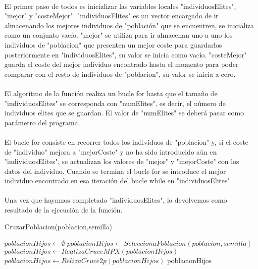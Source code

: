 	\paragraph{}El primer paso de todos es inicializar las variables locales "individuosElites", "mejor" y "costeMejor". "individuosElites" es un vector encargado de ir almacenando los mejores individuos de "población" que se encuentren, se inicializa como un conjunto vacío. "mejor" se utiliza para ir almacenan uno a uno los individuos de "poblacion" que presenten un mejor coste para guardarlos posteriormente en "individuosElites", su valor se inicia como vacío. "costeMejor" guarda el coste del mejor individuo encontrado hasta el momento para poder comparar con el resto de individuos de "poblacion", su valor se inicia a cero.
	
	\paragraph{}El algoritmo de la función realiza un bucle for hasta que el tamaño de "individuosElites" se corresponda con "numElites", es decir, el número de individuos elites que se guardan. El valor de "numElites" se deberá pasar como parámetro del programa.
	
	\paragraph{}El bucle for consiste en recorrer todos los individuos de "poblacion" y, si el coste de "individuo" mejora a "mejorCoste" y no ha sido introducido aún en "individuosElites", se actualizan los valores de "mejor" y "mejorCoste" con los datos del individuo. Cuando se termina el bucle for se introduce el mejor individuo encontrado en esa iteración del bucle while en "individuosElites".
	
	\paragraph{}Una vez que hayamos completado "individuosElites", lo devolvemos como resultado de la ejecución de la función.

	\begin{algorithm}[H]
		\caption{CruzarPoblacion(poblacion,semilla)}
		\begin{algorithmic}
			\STATE $poblacionHijos \leftarrow \emptyset$
			\STATE $poblacionHijos \leftarrow SeleccionaPoblacion(poblacion,semilla)$
			\STATE $poblacionHijos \leftarrow RealizaCruceMPX(poblacionHijos)$
			\ELSE
			\STATE $poblacionHijos \leftarrow RelizaCruce2p(poblacionHijos)$
			\ENDIF
			\RETURN poblacionHijos
		\end{algorithmic}
	\end{algorithm}

